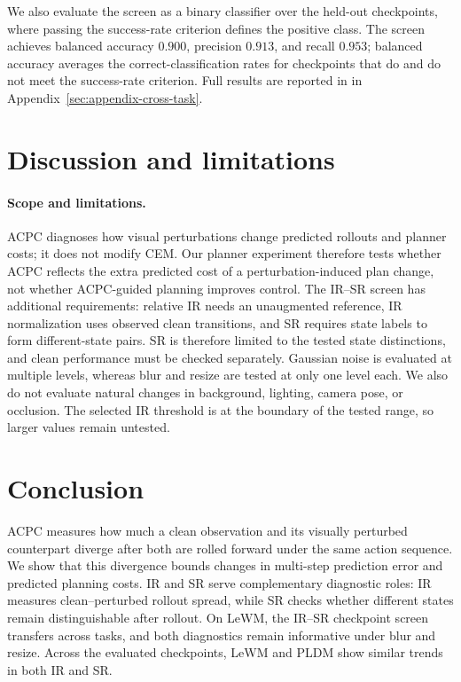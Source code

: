 \documentclass{article}
\begin{document}
We also evaluate the screen as a binary classifier over the held-out
checkpoints, where passing the success-rate criterion defines the positive
class. The screen achieves balanced accuracy $0.900$, precision $0.913$, and
recall $0.953$; balanced accuracy averages the correct-classification rates
for checkpoints that do and do not meet the success-rate criterion. Full
results are reported in  in
Appendix~\ref{sec:appendix-cross-task}.

\section{Discussion and limitations}\label{sec:disc}

\paragraph{Scope and limitations.}

ACPC diagnoses how visual perturbations change predicted rollouts and planner
costs; it does not modify CEM. Our planner experiment therefore tests whether
ACPC reflects the extra predicted cost of a perturbation-induced plan change,
not whether ACPC-guided planning improves control.
The IR--SR screen has additional requirements: relative IR needs an unaugmented
reference, IR normalization uses observed clean transitions, and SR requires
state labels to form different-state pairs. SR is therefore limited to the
tested state distinctions, and clean performance must be checked separately.
Gaussian noise is evaluated at multiple levels, whereas blur and resize are
tested at only one level each. We also do not evaluate natural changes in
background, lighting, camera pose, or occlusion. The selected IR threshold is
at the boundary of the tested range, so larger values remain untested.

\section{Conclusion}\label{sec:conc}

ACPC measures how much a clean observation and its visually perturbed
counterpart diverge after both are rolled forward under the same action
sequence. We show that this divergence bounds changes in multi-step prediction
error and predicted planning costs. IR and SR serve complementary diagnostic
roles: IR measures clean--perturbed rollout spread, while SR checks whether
different states remain distinguishable after rollout. On LeWM, the IR--SR
checkpoint screen transfers across tasks, and both diagnostics remain
informative under blur and resize. Across the evaluated checkpoints, LeWM and
PLDM show similar trends in both IR and SR\label{sec:main-text-end}.
\end{document}
